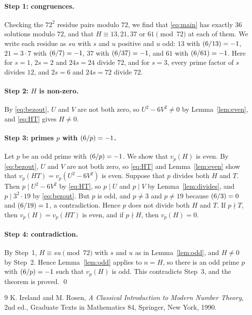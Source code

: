 \documentclass[11pt]{article}
\newcommand{\leg}[2]{\mathchoice{\biggl(\dfrac{#1}{#2}\biggr)}{(#1/#2)}{(#1/#2)}{(#1/#2)}}
\begin{document}
\paragraph{Step 1: congruences.} Checking the $72^2$ residue pairs modulo $72$, we find that \eqref{eq:main} has exactly 36 solutions modulo $72$, and that $H\equiv13,\allowbreak 21,\allowbreak 37\text{ or }61\pmod{72}$ at each of them. We write each residue as $su$ with $s$ and $u$ positive and $u$ odd: $13$ with $\leg{6}{13}=-1$, $21=3\cdot7$ with $\leg{6}{7}=-1$, $37$ with $\leg{6}{37}=-1$, and $61$ with $\leg{6}{61}=-1$. Here for $s=1$, $2s=2$ and $24s=24$ divide $72$, and for $s=3$, every prime factor of $s$ divides $12$, and $2s=6$ and $24s=72$ divide $72$.

\paragraph{Step 2: $H$ is non-zero.} By \eqref{eq:bezout}, $U$ and $V$ are not both zero, so $U^2-6V^2\neq0$ by Lemma~\ref{lem:even}, and \eqref{eq:HT} gives $H\neq0$.

\paragraph{\texorpdfstring{Step 3: primes $p$ with $\leg{6}{p}=-1$.}{Step 3: inert primes.}} Let $p$ be an odd prime with $\leg{6}{p}=-1$. We show that $v_p(H)$ is even. By \eqref{eq:bezout}, $U$ and $V$ are not both zero, so \eqref{eq:HT} and Lemma~\ref{lem:even} show that $v_p(HT)=v_p(U^2-6V^2)$ is even. Suppose that $p$ divides both $H$ and $T$. Then $p\mid U^2-6V^2$ by \eqref{eq:HT}, so $p\mid U$ and $p\mid V$ by Lemma~\ref{lem:divides}, and $p\mid 3^{2}\cdot 19$ by \eqref{eq:bezout}. But $p$ is odd, and $p\neq3$ and $p\neq19$ because $\leg{6}{3}=0$ and $\leg{6}{19}=1$, a contradiction. Hence $p$ does not divide both $H$ and $T$. If $p\nmid T$, then $v_p(H)=v_p(HT)$ is even, and if $p\nmid H$, then $v_p(H)=0$.

\paragraph{Step 4: contradiction.} By Step~1, $H\equiv su\pmod{72}$ with $s$ and $u$ as in Lemma~\ref{lem:odd}, and $H\neq0$ by Step~2. Hence Lemma~\ref{lem:odd} applies to $n=H$, so there is an odd prime $p$ with $\leg{6}{p}=-1$ such that $v_p(H)$ is odd. This contradicts Step~3, and the theorem is proved.
\qed

\begin{thebibliography}{9}
 K. Ireland and M. Rosen, \emph{A Classical Introduction to Modern Number Theory}, 2nd ed., Graduate Texts in Mathematics 84, Springer, New York, 1990.
\end{thebibliography}
\end{document}
